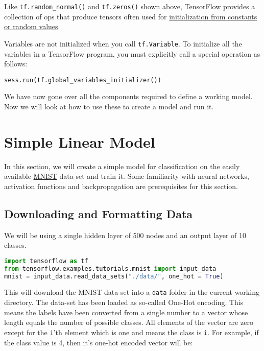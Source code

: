 \documentclass[Proceedings]{ascelike}
\begin{document}
Like \texttt{tf.random\_normal()} and \texttt{tf.zeros()} shown above, TensorFlow provides a collection of ops that produce tensors often used for \href{https://www.tensorflow.org/versions/r1.0/api_guides/python/constant_op}{initialization from constants or random values}.

Variables are not initialized when you call \texttt{tf.Variable}. To initialize all the variables in a TensorFlow program, you must explicitly call a special operation as follows:

\begin{lstlisting}
sess.run(tf.global_variables_initializer())
\end{lstlisting}

We have now gone over all the components required to define a working model. Now we will look at how to use these to create a model and run it.

\section{Simple Linear Model}

In this section, we will create a simple model for classification on the easily available \href{https://en.wikipedia.org/wiki/MNIST_database}{MNIST} data-set and train it. Some familiarity with neural networks, activation functions and backpropagation are prerequisites for this section.

\subsection{Downloading and Formatting Data}
We will be using a single hidden layer of 500 nodes and an output layer of 10 classes.

\begin{lstlisting}[language=Python]
import tensorflow as tf
from tensorflow.examples.tutorials.mnist import input_data
mnist = input_data.read_data_sets("./data/", one_hot = True)
\end{lstlisting}

This will download the MNIST data-set into a \texttt{data} folder in the current working directory. The data-set has been loaded as so-called One-Hot encoding. This means the labels have been converted from a single number to a vector whose length equals the number of possible classes. All elements of the vector are zero except for the \texttt{i}'th element which is one and means the class is \texttt{i}.
For example, if the class value is 4, then it's one-hot encoded vector will be:
\end{document}

